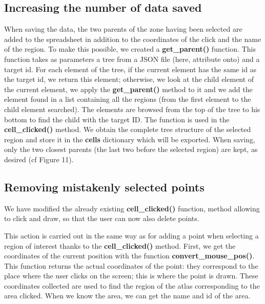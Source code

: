 \documentclass[a4paper,12pt]{report}
\begin{document}
\subsection{Increasing the number of data saved}
When saving the data, the two parents of the zone having been selected are added to the spreadsheet in addition to the coordinates of the click and the name of the region. To make this possible, we created a \textbf{get\_parent()} function. This function takes as parameters a tree from a JSON file (here, attribute onto) and a target id. For each element of the tree, if the current element has the same id as the target id, we return this element; otherwise, we look at the child element of the current element, we apply the \textbf{get\_parent()} method to it and we add the element found in a list containing all the regions (from the first element to the child element searched). The elements are browsed from the top of the tree to his bottom to find the child with the target ID. The function is used in the \textbf{cell\_clicked()} method. We obtain the complete tree structure of the selected region and store it in the \textbf{cells} dictionary which will be exported. When saving, only the two closest parents (the last two before the selected region) are kept, as desired (cf Figure 11).\\

\subsection{Removing mistakenly selected points}
We have modified the already existing \textbf{cell\_clicked()} function, method allowing to click and draw, so that the user can now also delete points.

This action is carried out in the same way as for adding a point when selecting a region of interest thanks to the \textbf{cell\_clicked()} method. First, we get the coordinates of the current position with the function \textbf{convert\_mouse\_pos()}. This function returns the actual coordinates of the point: they correspond to the place where the user clicks on the screen; this is where the point is drawn. These coordinates collected are used to find the region of the atlas corresponding to the area clicked. When we know the area, we can get the name and id of the area. 
\end{document}
